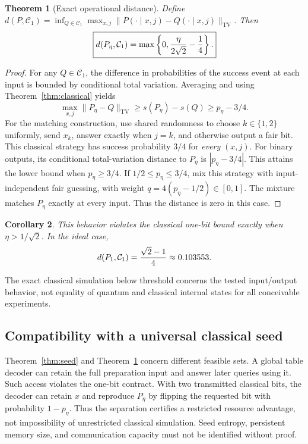 \documentclass[11pt,a4paper]{article}
\newtheorem{theorem}{Theorem}[section]
\newtheorem{corollary}[theorem]{Corollary}
\theoremstyle{definition}
\newcommand{\TV}{\operatorname{TV}}
\begin{document}
\begin{theorem}[Exact operational distance]\label{thm:distance}
Define $d(P,\mathcal C_1)=\inf_{Q\in\mathcal C_1}\max_{x,j}
\|P(\cdot\mid x,j)-Q(\cdot\mid x,j)\|_{\TV}$. Then
\[
 \boxed{d(P_\eta,\mathcal C_1)=
 \max\left\{0,{\eta\over2\sqrt2}-{1\over4}\right\}.}
\]
\end{theorem}
\begin{proof}
For any $Q\in\mathcal C_1$, the difference in probabilities of the success event at each input is bounded by conditional total variation. Averaging and using Theorem~\ref{thm:classical} yields
\[
 \max_{x,j}\|P_\eta-Q\|_{\TV}\ge s(P_\eta)-s(Q)\ge p_\eta-3/4.
\]
For the matching construction, use shared randomness to choose $k\in\{1,2\}$ uniformly, send $x_k$, answer exactly when $j=k$, and otherwise output a fair bit. This classical strategy has success probability $3/4$ for \emph{every} $(x,j)$. For binary outputs, its conditional total-variation distance to $P_\eta$ is $|p_\eta-3/4|$. This attains the lower bound when $p_\eta\ge3/4$. If $1/2\le p_\eta\le3/4$, mix this strategy with input-independent fair guessing, with weight $q=4(p_\eta-1/2)\in[0,1]$. The mixture matches $P_\eta$ exactly at every input. Thus the distance is zero in this case.
\end{proof}

\begin{corollary}
This behavior violates the classical one-bit bound exactly when $\eta>1/\sqrt2$. In the ideal case,
\[
 d(P_1,\mathcal C_1)={\sqrt2-1\over4}\approx0.103553.
\]
\end{corollary}
The exact classical simulation below threshold concerns the tested input/output behavior, not equality of quantum and classical internal states for all conceivable experiments.

\subsection{Compatibility with a universal classical seed}
Theorem~\ref{thm:seed} and Theorem~\ref{thm:distance} concern different feasible sets. A global table decoder can retain the full preparation input and answer later queries using it. Such access violates the one-bit contract. With two transmitted classical bits, the decoder can retain $x$ and reproduce $P_\eta$ by flipping the requested bit with probability $1-p_\eta$. Thus the separation certifies a restricted resource advantage, not impossibility of unrestricted classical simulation. Seed entropy, persistent memory size, and communication capacity must not be identified without proof.
\end{document}
